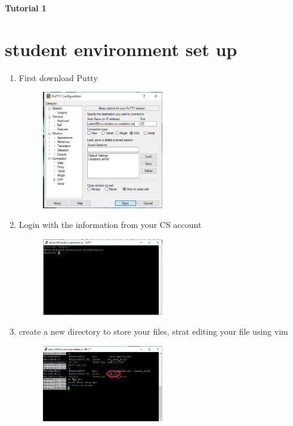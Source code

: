 \documentclass[12pt]{article}
\begin{document}
\begin{center}
    \textbf{\large Tutorial 1}
\end{center}

\section{student environment set up}
\begin{enumerate}
    \item First download Putty
    \begin{figure}[tbhp]
        \begin{center}
            \includegraphics[width=0.5\textwidth]{Picture1.png}
        \end{center}
    \end{figure}

    \item Login with the information from your CS account
    \begin{figure}[tbhp]
        \begin{center}
            \includegraphics[width=0.5\textwidth]{Picture2.png}
        \end{center}
    \end{figure}
    \item create a new directory to store your files, strat editing your file using vim
    \begin{figure}[tbhp]
        \begin{center}
            \includegraphics[width=0.5\textwidth]{Picture3.png}
        \end{center}
    \end{figure}
\end{enumerate}
\end{document}
